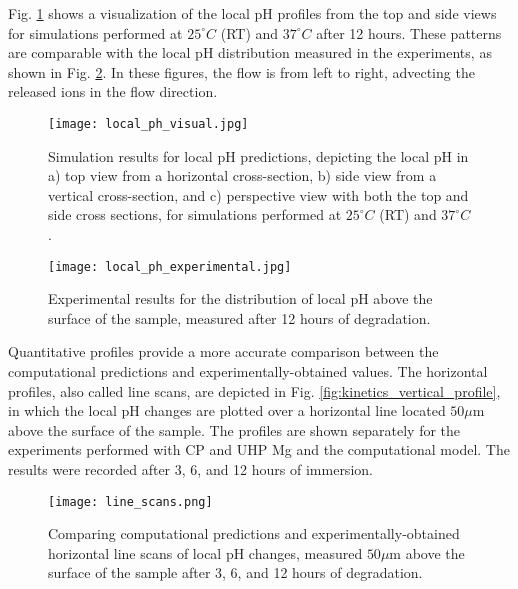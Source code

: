 Fig. \ref{fig:kinetics_local_ph_visual} shows a visualization of the local pH profiles from the top and side views for simulations performed at  $25^{\circ}C$ ({RT}) and $37^{\circ}C$ after 12 hours. These patterns are comparable with the local pH distribution measured in the experiments, as shown in Fig. \ref{fig:kinetics_local_ph_experimental}. In these figures, the flow is from left to right, advecting the released ions in the flow direction.

\begin{figure}[h]
\centering
\medskip
\texttt{[image: local\_ph\_visual.jpg]}
\caption[Simulation results for local pH predictions]{Simulation results for local pH predictions, depicting the local pH in a) top view from a horizontal cross-section, b) side view from a vertical cross-section, and c) perspective view with both the top and side cross sections, for simulations performed at $25^{\circ}C$ ({RT}) and $37^{\circ}C$.} \label{fig:kinetics_local_ph_visual}
\end{figure}

\begin{figure}[h]
\centering
\medskip
\texttt{[image: local\_ph\_experimental.jpg]}
\caption[Experimental results for the distribution of local pH above the sample]{Experimental results for the distribution of local pH above the surface of the sample, measured after 12 hours of degradation.} \label{fig:kinetics_local_ph_experimental}
\end{figure}

Quantitative profiles provide a more accurate comparison between the computational predictions and experimentally-obtained values. The horizontal profiles, also called line scans, are depicted in Fig. \ref{fig:kinetics_vertical_profile}, in which the local pH changes are plotted over a horizontal line located $50 \mu\mathrm{m}$ above the surface of the sample. The profiles are shown separately for the experiments performed with {CP} and {UHP} Mg and the computational model. The results were recorded after 3, 6, and 12 hours of immersion.

\begin{figure}[h]
\centering
\medskip
\texttt{[image: line\_scans.png]}
\caption[Comparing computational and experimental for horizontal line scans of local pH]{Comparing computational predictions and experimentally-obtained horizontal line scans of local pH changes, measured $50 \mu\mathrm{m}$ above the surface of the sample after 3, 6, and 12 hours of degradation.} \label{fig:kinetics_line_scans}
\end{figure}

